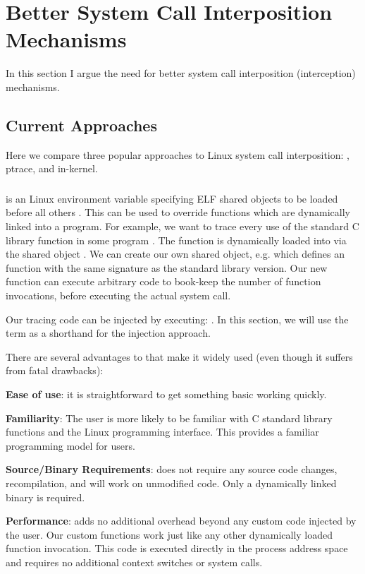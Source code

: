 \section{Better System Call Interposition Mechanisms}
In this section I argue the need for better system call interposition (interception) mechanisms.

\subsection{Current Approaches}
Here we compare three popular approaches to Linux system call interposition: \ldpreload, ptrace, and in-kernel.

\subsubsection{\ldpreload{}}
\ldpreload{} is an Linux environment variable specifying ELF shared objects to be loaded before all others \cite{ld}. This can be used to override functions which are dynamically linked into a program. For example, we want to trace every use of the  standard C library function in some program . The  function is dynamically loaded into  via the shared object . We can create our own shared object, e.g.  which defines an  function with the same signature as the standard library version. Our new  function can execute arbitrary code to book-keep the number of function invocations, before executing the actual  system call.

Our tracing code can be injected by executing: . In this section, we will use the term \ldpreload{} as a shorthand for the \ldpreload{} injection approach.

There are several advantages to \ldpreload{} that make it widely used (even though it suffers from fatal drawbacks):
\begin{compactitem}
    \item \textbf{Ease of use}: it is straightforward to get something basic working quickly.
    \item \textbf{Familiarity}: The user is more likely to be familiar with C standard library functions and the Linux programming interface. This provides a familiar programming model for users.
    \item \textbf{Source/Binary Requirements}: \ldpreload{} does not require any source code changes, recompilation, and will work on unmodified code. Only a dynamically linked binary is required.
    \item \textbf{Performance}: \ldpreload{} adds no additional overhead beyond any custom code injected by the user. Our custom functions work just like any other dynamically loaded function invocation. This code is executed directly in the process address space and requires no additional context switches or system calls.
\end{compactitem}

